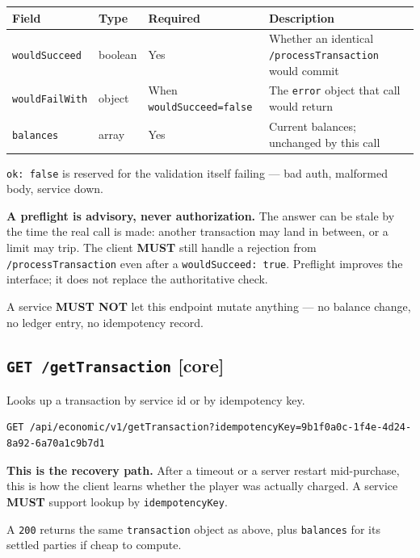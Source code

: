 \documentclass[11pt,a4paper]{article}
\newcommand{\code}[1]{\texttt{\small #1}}
\newcommand{\req}{\textbf{MUST}}
\newcommand{\core}{{\small\color{omceAccentDark}\textbf{[core]}}}
\newcommand{\keybox}[2]{%
  \par\vspace{0.5em}\noindent
  \colorbox{#1}{%
    \begin{minipage}{\dimexpr\linewidth-2\fboxsep\relax}
    \vspace{0.35em}\small #2\vspace{0.35em}
    \end{minipage}}%
  \par\vspace{0.5em}}
\newcommand{\warn}[1]{\keybox{omceWarnWash}{#1}}
\begin{document}
\begin{tabularx}{\linewidth}{L{3.2cm} L{1.7cm} L{2.7cm} X}
\toprule
\textbf{Field} & \textbf{Type} & \textbf{Required} & \textbf{Description}\\
\midrule
\code{wouldSucceed}  & boolean & Yes & Whether an identical \code{/processTransaction} would commit\\
\code{wouldFailWith} & object  & When \code{wouldSucceed=false} & The \code{error} object that call would return\\
\code{balances}      & array   & Yes & Current balances; unchanged by this call\\
\bottomrule
\end{tabularx}

\code{ok: false} is reserved for the validation itself failing --- bad auth, malformed body, service
down.

\warn{\textbf{A preflight is advisory, never authorization.} The answer can be stale by the time the
real call is made: another transaction may land in between, or a limit may trip. The client \req{}
still handle a rejection from \code{/processTransaction} even after a \code{wouldSucceed: true}.
Preflight improves the interface; it does not replace the authoritative check.}

A service \textbf{MUST NOT} let this endpoint mutate anything --- no balance change, no ledger
entry, no idempotency record.

\subsection{\code{GET /getTransaction} \core}

Looks up a transaction by service id or by idempotency key.

\begin{lstlisting}[style=http]
GET /api/economic/v1/getTransaction?idempotencyKey=9b1f0a0c-1f4e-4d24-8a92-6a70a1c9b7d1
\end{lstlisting}

\warn{\textbf{This is the recovery path.} After a timeout or a server restart mid-purchase, this is
how the client learns whether the player was actually charged. A service \req{} support lookup by
\code{idempotencyKey}.}

A \code{200} returns the same \code{transaction} object as above, plus \code{balances} for its
settled parties if cheap to compute.
\end{document}
